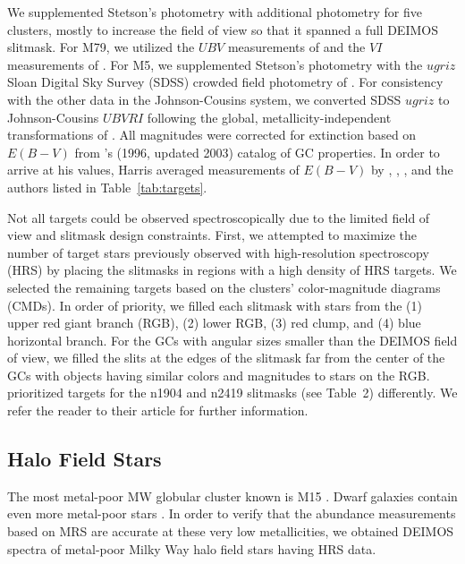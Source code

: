 \documentclass{emulateapj}
\begin{document}
We supplemented Stetson's photometry with additional photometry for
five clusters, mostly to increase the field of view so that it spanned
a full DEIMOS slitmask.  For M79, we utilized the $UBV$ measurements
of \citet{kra97} and the $VI$ measurements of \citet{ros00}.
For M5, we supplemented Stetson's photometry with the $ugriz$ Sloan
Digital Sky Survey (SDSS) crowded field photometry of \citet{an08}.
For consistency with the other data in the Johnson-Cousins system, we
converted SDSS $ugriz$ to Johnson-Cousins $UBVRI$ following the
global, metallicity-independent transformations of \citet*{jor06}.
All magnitudes were corrected for extinction based on $E(B-V)$ from
\citeauthor{har96}'s (1996, updated 2003) catalog of GC properties.
In order to arrive at his values, Harris averaged measurements of
$E(B-V)$ by \citet{ree88}, \citet{web85}, \citet{zin85}, and the
authors listed in Table~\ref{tab:targets}.

Not all targets could be observed spectroscopically due to the limited
field of view and slitmask design constraints.  First, we attempted to
maximize the number of target stars previously observed with
high-resolution spectroscopy (HRS) by placing the slitmasks in regions
with a high density of HRS targets.  We selected the remaining targets
based on the clusters' color-magnitude diagrams (CMDs).  In order of
priority, we filled each slitmask with stars from the (1) upper red
giant branch (RGB), (2) lower RGB, (3) red clump, and (4) blue
horizontal branch.  For the GCs with angular sizes smaller than the
DEIMOS field of view, we filled the slits at the edges of the slitmask
far from the center of the GCs with objects having similar colors and
magnitudes to stars on the RGB.  \citet{sim07} prioritized targets for
the n1904 and n2419 slitmasks (see Table~2) differently.  We refer the
reader to their article for further information.

\subsection{Halo Field Stars}

The most metal-poor MW globular cluster known is M15 \citep[$\mathfeh
  = -2.38$;][]{sne97,sne00,pri05}.  Dwarf galaxies contain even more
metal-poor stars \citep[e.g.,][]{she01a,ful04}.  In order to verify
that the abundance measurements based on MRS are accurate at these
very low metallicities, we obtained DEIMOS spectra of metal-poor Milky
Way halo field stars having HRS data.
\end{document}
